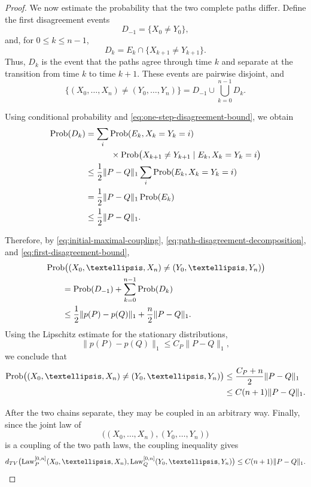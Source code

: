 \documentclass[10pt,a4paper]{amsart}
\newcommand{\Law}{\operatorname{Law}}
\newcommand{\Prob}{\operatorname{Prob}}
\begin{document}
\begin{proof}
We now estimate the probability that the two complete paths differ.
Define the first disagreement events
$$
 D_{-1}=\{X_0\ne Y_0\},
$$
and, for $0\le k\le n-1$,
$$
 D_k
 =
 E_k\cap\{X_{k+1}\ne Y_{k+1}\}.
$$
Thus, $D_k$ is the event that the paths agree through time $k$ and
separate at the transition from time $k$ to time $k+1$.  These
events are pairwise disjoint, and
\begin{equation}\label{eq:path-disagreement-decomposition}
 \bigl\{
   (X_0,\ldots,X_n)\ne(Y_0,\ldots,Y_n)
 \bigr\}
 =
 D_{-1}\cup\bigcup_{k=0}^{n-1}D_k.
\end{equation}

Using conditional probability and
\eqref{eq:one-step-disagreement-bound}, we obtain
\begin{align}
 \Prob(D_k)
 &=
 \sum_i
 \Prob(E_k,X_k=Y_k=i)
 \notag\\
 &\qquad\quad\times
 \Prob\bigl(
   X_{k+1}\ne Y_{k+1}
   \mid E_k,X_k=Y_k=i
 \bigr)
 \notag\\
 &\le
 \frac12\|P-Q\|_1
 \sum_i\Prob(E_k,X_k=Y_k=i)
 \notag\\
 &=
 \frac12\|P-Q\|_1\Prob(E_k)
 \notag\\
 &\le
 \frac12\|P-Q\|_1.
 \label{eq:first-disagreement-bound}
\end{align}

Therefore, by \eqref{eq:initial-maximal-coupling},
\eqref{eq:path-disagreement-decomposition}, and
\eqref{eq:first-disagreement-bound},
\begin{align}
 &\Prob\bigl(
   (X_0,\ldots,X_n)\ne(Y_0,\ldots,Y_n)
 \bigr)
 \notag\\
 &\qquad
 =
 \Prob(D_{-1})
 +\sum_{k=0}^{n-1}\Prob(D_k)
 \notag\\
 &\qquad
 \le
 \frac12\|p(P)-p(Q)\|_1
 +\frac n2\|P-Q\|_1.
 \label{eq:path-disagreement-expanded}
\end{align}
Using the Lipschitz estimate for the stationary distributions,
$$
 \|p(P)-p(Q)\|_1
 \le C_P\|P-Q\|_1,
$$
we conclude that
\begin{align}
 \Prob\bigl(
   (X_0,\ldots,X_n)\ne(Y_0,\ldots,Y_n)
 \bigr)
 &\le
 \frac{C_P+n}{2}\|P-Q\|_1
 \notag\\
 &\le
 C(n+1)\|P-Q\|_1.
 \label{eq:path-coupling-expanded}
\end{align}

After the two chains separate, they may be coupled in an arbitrary
way. %
%
Finally, since the joint law of
$$
 \bigl((X_0,\ldots,X_n),(Y_0,\ldots,Y_n)\bigr)
$$
is a coupling of the two path laws, the coupling inequality gives
$$
 d_{\rm TV}\bigl(
   \Law_P^{[0,n]}(X_0,\ldots,X_n),
   \Law_Q^{[0,n]}(Y_0,\ldots,Y_n)
 \bigr)
 \le
 C(n+1)\|P-Q\|_1.
$$



\end{proof}
\end{document}
